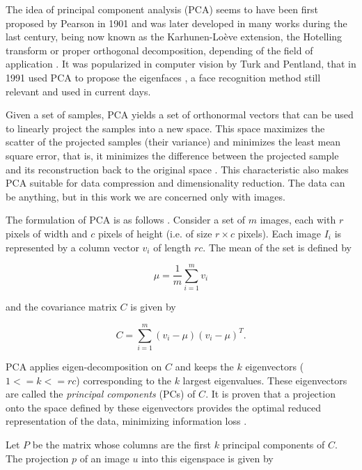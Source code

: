 \documentclass[10pt, conference, compsocconf]{IEEEtran}
\begin{document}
The idea of principal component analysis (PCA) seems to have been first proposed by Pearson in 1901 \cite{pearson1901} and was later developed in many works during the last century, being now known as the Karhunen-Loève extension, the Hotelling transform or proper orthogonal decomposition, depending of the field of application \cite{sirovich87}. It was popularized in computer vision by Turk and Pentland, that in 1991 used PCA to propose the eigenfaces \cite{turk91}, a face recognition method still relevant and used in current days. %

Given a set of samples, PCA yields a set of orthonormal vectors that can be used to linearly project the samples into a new space. This space maximizes the scatter of the projected samples (their variance) and minimizes the least mean square error, that is, it minimizes the difference between the projected sample and its reconstruction back to the original space \cite{shlens09}. This characteristic also makes PCA suitable for data compression and dimensionality reduction. The data can be anything, but in this work we are concerned only with images.

The formulation of PCA is as follows \cite{borja09}. Consider a set of $m$ images, each with $r$ pixels of width and $c$ pixels of height (i.e. of size $r \times c$ pixels). Each image $I_i$ is represented by a column vector $v_i$ of length $rc$. The mean of the set is defined by

\begin{equation}
  \mu = \frac{1}{m} \sum_{i=1}^m{v_i}
\end{equation}

\noindent and the covariance matrix $C$ is given by

\begin{equation}
  C = \sum_{i=1}^m{(v_i - \mu)(v_i - \mu)^T}.
\end{equation}

PCA applies eigen-decomposition on $C$ and keeps the $k$ eigenvectors ($1 <= k <= rc$) corresponding to the $k$ largest eigenvalues. These eigenvectors are called the \emph{principal components} (PCs) of $C$. It is proven that a projection onto the space defined by these eigenvectors provides the optimal reduced representation of the data, minimizing information loss \cite{shlens09}.

Let $P$ be the matrix whose columns are the first $k$ principal components of $C$. The projection $p$ of an image $u$ into this eigenspace is given by
\end{document}
